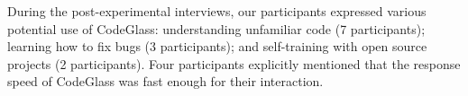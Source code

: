 During the post-experimental interviews, our participants expressed various potential use of CodeGlass: understanding unfamiliar code (7 participants); learning how to fix bugs (3 participants); and self-training with open source projects (2 participants).
Four participants explicitly mentioned that the response speed of CodeGlass was fast enough for their interaction.





